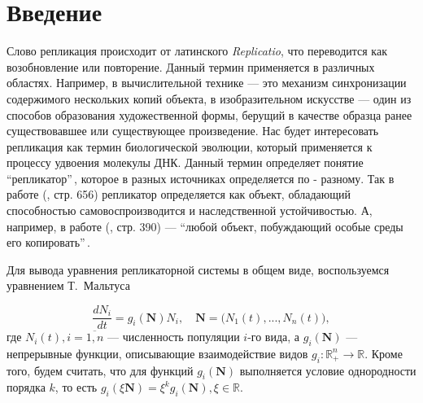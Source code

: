 \chapter*{Введение}                         %

\newcommand{\actuality}{}
\newcommand{\progress}{}
\newcommand{\aim}{{\textbf\aimTXT}}
\newcommand{\tasks}{\textbf{\tasksTXT}}
\newcommand{\novelty}{\textbf{\noveltyTXT}}
\newcommand{\influence}{\textbf{\influenceTXT}}
\newcommand{\theoryInfluence}{\textbf{\theoryInfluenceTXT}}
\newcommand{\methods}{\textbf{\methodsTXT}}
\newcommand{\defpositions}{\textbf{\defpositionsTXT}}
\newcommand{\reliability}{\textbf{\reliabilityTXT}}
\newcommand{\probation}{\textbf{\probationTXT}}
\newcommand{\contribution}{\textbf{\contributionTXT}}
\newcommand{\publications}{\textbf{\publicationsTXT}}
\newcommand{\volumeAndStructureWork}{\textbf{\volumeAndStructureWorkTXT}}


Слово репликация происходит от латинского \textit{Replicatio}, что переводится как возобновление или повторение. Данный термин применяется в различных областях. Например, в вычислительной технике --- это механизм синхронизации содержимого нескольких копий объекта, в изобразительном искусстве --- один из способов образования художественной формы, берущий в качестве образца ранее существовавшее или существующее произведение. Нас будет интересовать репликация как термин биологической эволюции, который применяется к процессу удвоения молекулы ДНК. Данный термин определяет понятие ``репликатор''\,, которое в разных источниках определяется по - разному. Так в работе (\cite{Markov}, стр. 656) репликатор определяется как объект, обладающий способностью самовоспроизводится и наследственной устойчивостью. А, например, в работе (\cite{Deutsch}, стр. 390) --- ``любой объект, побуждающий особые среды его копировать''\,. 

Для вывода уравнения репликаторной системы в общем виде, воспользуемся уравнением Т.~Мальтуса

\begin{equation}
\frac{dN_{i}}{dt} = g_{i}(\mathbf {N})N_{i}, \quad \mathbf {N} = \Big(N_{1}(t), ..., N_{n}(t)\Big),
\label{intr_eq1}
\end{equation}
где $N_{i}(t), i = \overline{1, n}$ --- численность популяции $i$-го вида, а $g_{i}(\mathbf {N})$ --- непрерывные функции, описывающие взаимодействие видов $g_{i}: \mathbb{R}_{+}^{n} \to \mathbb{R}$. Кроме того, будем считать, что для функций $g_{i}(\mathbf {N})$ выполняется условие однородности порядка $k$, то есть $g_{i}(\xi \mathbf {N}) = \xi^{k}g_{i}(\mathbf {N}), \xi \in \mathbb{R}$. 

